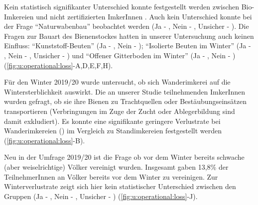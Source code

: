 Kein statistisch signifikanter Unterschied konnte festgestellt werden zwischen Bio-Imkereien  und nicht zertifizierten ImkerInnen . Auch kein Unterschied konnte bei der Frage \enquote{Naturwabenbau} beobachtet werden (Ja - , Nein - , Unsicher - ). Die Fragen zur Bauart des Bienenstockes hatten in unserer Untersuchung auch keinen Einfluss: \enquote{Kunststoff-Beuten} (Ja - , Nein - ); \enquote{Isolierte Beuten im Winter} (Ja - , Nein - , Unsicher - ) und \enquote{Offener Gitterboden im Winter} (Ja - , Nein - ) (\cref{fig:u:operational:loss}-A,D,E,F,H).

\label{ss:stand_wander:U}

Für den Winter 2019/20 wurde untersucht, ob sich Wanderimkerei auf die Wintersterblichkeit auswirkt. Die an unserer Studie teilnehmenden ImkerInnen wurden gefragt, ob sie ihre Bienen zu Trachtquellen oder Bestäubungseinsätzen transportieren (Verbringungen im Zuge der Zucht oder Ablegerbildung sind damit exkludiert).
\newline
Es konnte eine signifikante geringere Verlustrate bei Wanderimkereien () im Vergleich zu Standimkereien  festgestellt werden (\cref{fig:u:operational:loss}-B). 

\label{ss:vereinigung:U}

Neu in der Umfrage 2019/20 ist die Frage ob vor dem Winter bereits schwache (aber weiselrichtige) Völker vereinigt wurden. Insgesamt gaben 13,8\% der TeilnehmerInnen an Völker bereits vor dem Winter zu vereinigen. Zur Winterverlustrate zeigt sich hier kein statistischer Unterschied zwischen den Gruppen (Ja - , Nein - , Unsicher - ) (\cref{fig:u:operational:loss}-J).

